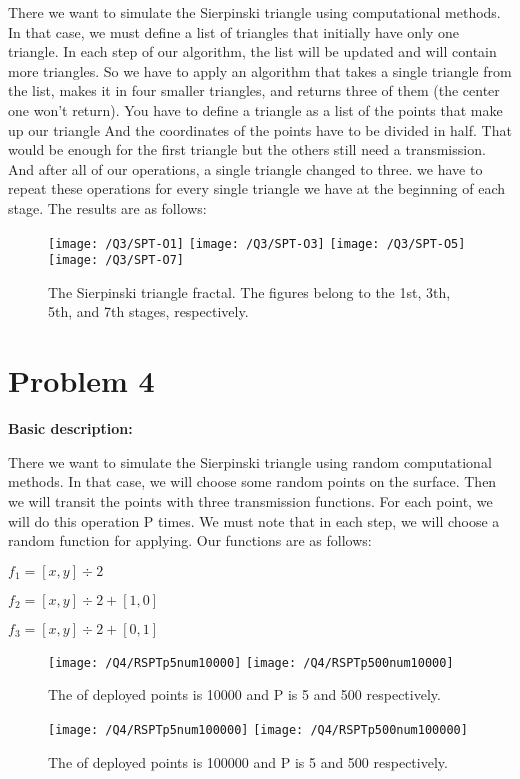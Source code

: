 \documentclass{article}
\begin{document}
    There we want to simulate the Sierpinski triangle using computational methods.
    In that case, we must define a list of triangles that initially have only one triangle.
    In each step of our algorithm, the list will be updated and will contain more triangles.
    So we have to apply an algorithm that takes a single triangle from the list,
    makes it in four smaller triangles, and returns three of them (the center one won't return).
    You have to define a triangle as a list of the points that
make up our triangle
    And the coordinates of the points have to be divided in half.
    That would be enough for the first triangle but the others still need a transmission.
    And after all of our operations, a single triangle changed to three.
    we have to repeat these operations for every single triangle we have at the beginning of each stage.
    The results are as follows:
    \begin{figure}[!htb]
        \centering
        \texttt{[image: /Q3/SPT-O1]}
        \label{fig:3.1.1}
        \texttt{[image: /Q3/SPT-O3]}
        \label{fig:3.1.2}
        \texttt{[image: /Q3/SPT-O5]}
        \label{fig:3.1.3}
        \texttt{[image: /Q3/SPT-O7]}
        \label{fig:3.1.3}
        \caption{The Sierpinski triangle fractal. The figures belong to the 1st, 3th, 5th, and 7th stages, respectively.}
    \end{figure}
    \section*{Problem 4}
    \textbf{Basic description:}

    There we want to simulate the Sierpinski triangle using random computational methods.
    In that case, we will choose some random points on the surface.
    Then we will transit the points with three transmission functions.
    For each point, we will do this operation P times.
    We must note that in each step,
    we will choose a random function for applying.
    Our functions are as follows:

    $f_{1} = [x, y] \div 2$

    $f_{2} = [x, y] \div 2 + [1, 0]$

    $f_{3} = [x, y] \div 2 + [0, 1]$

    \begin{figure}[!htb]
        \centering
        \texttt{[image: /Q4/RSPTp5num10000]}
        \label{fig:4.1.1}
        \texttt{[image: /Q4/RSPTp500num10000]}
        \label{fig:4.1.2}
        \caption{The of deployed points is 10000 and P is 5 and 500 respectively.}
    \end{figure}
    \begin{figure}[!htb]
        \centering
        \texttt{[image: /Q4/RSPTp5num100000]}
        \label{fig:4.2.1}
        \texttt{[image: /Q4/RSPTp500num100000]}
        \label{fig:4.2.2}
        \caption{The of deployed points is 100000 and P is 5 and 500 respectively.}
    \end{figure}
\end{document}
